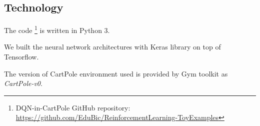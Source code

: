 \subsection{Technology}
The code \footnote{DQN-in-CartPole GitHub repository: \url{https://github.com/EduBic/ReinforcementLearning-ToyExamples}} is written in Python 3.

We built the neural network architectures with Keras library on top of Tensorflow.

The version of CartPole environment used is provided by Gym toolkit as \textit{CartPole-v0}.



